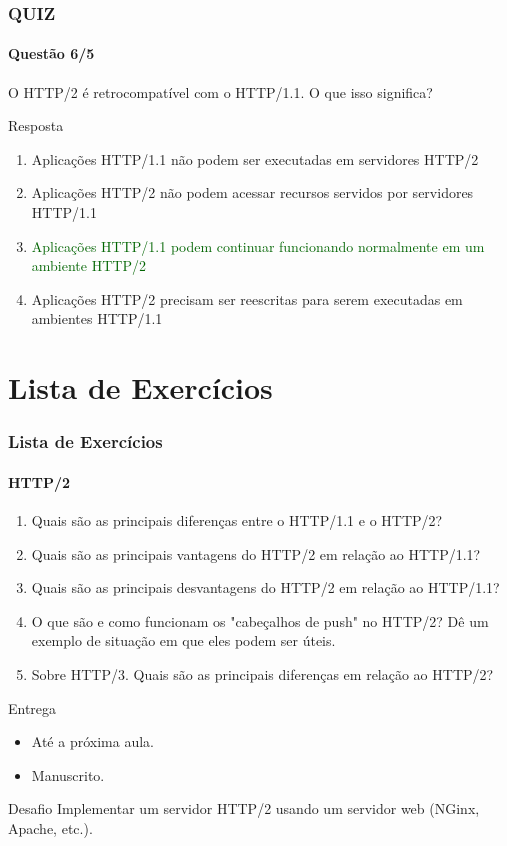 \documentclass[
	9pt, %
	t, %
]{beamer}
\begin{document}
\begin{frame}
	\frametitle{QUIZ}
	\framesubtitle{Questão 6/5}

	{\Large O HTTP/2 é retrocompatível com o HTTP/1.1. O que isso significa? }

	\begin{exampleblock}{Resposta}
		\begin{enumerate}[a]
			\item Aplicações HTTP/1.1 não podem ser executadas em servidores HTTP/2
			\item Aplicações HTTP/2 não podem acessar recursos servidos por servidores HTTP/1.1
			\item \textcolor{darkgreen}{Aplicações HTTP/1.1 podem continuar funcionando normalmente em um ambiente HTTP/2}
			\item Aplicações HTTP/2 precisam ser reescritas para serem executadas em ambientes HTTP/1.1
		\end{enumerate}
	\end{exampleblock}

\end{frame}

\section{Lista de Exercícios}

\begin{frame}
	\frametitle{Lista de Exercícios}
	\framesubtitle{HTTP/2}

	\begin{enumerate}
		\item Quais são as principais diferenças entre o HTTP/1.1 e o HTTP/2?
		\item Quais são as principais vantagens do HTTP/2 em relação ao HTTP/1.1?
		\item Quais são as principais desvantagens do HTTP/2 em relação ao HTTP/1.1?
		\item O que são e como funcionam os "cabeçalhos de push" no HTTP/2? Dê um exemplo de situação em que eles podem ser úteis.
		\item Sobre HTTP/3. Quais são as principais diferenças em relação ao HTTP/2?
	\end{enumerate}

	\begin{exampleblock}{Entrega}
		\begin{itemize}
			\item Até a próxima aula.
			\item Manuscrito.
		\end{itemize}
	\end{exampleblock}

	\begin{block}{Desafio}
		Implementar um servidor HTTP/2 usando um servidor web (NGinx, Apache, etc.).
	\end{block}

\end{frame}
\end{document}
